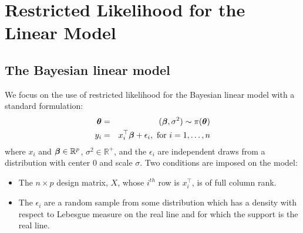 \documentclass[11pt]{article}
\makeatletter
\def\bth{\mbox{\boldmath $\theta$}}
\def\bbeta{\mbox{\boldmath $\beta$}}
\newcommand{\green}[1]{{\color{green}#1}}
\newcommand{\labitem}[2]{%
\def\@itemlabel{\textbf{#1}{.}}
\item
\def\@currentlabel{#1}\label{#2}}
\makeatother
\begin{document}
\section{Restricted Likelihood for the Linear Model}
\label{BayesLinMod}

\subsection{The Bayesian linear model}
We focus on the use of restricted likelihood for the Bayesian linear
model with a standard formulation: 
\begin{eqnarray}
\label{LinearModel}
\bth&=&(\bbeta,\sigma^2) \sim  \pi(\bth) 
\nonumber\\
y_i  & =  & x_i^\top \bbeta + \epsilon_i , \mbox{ for } i = 1, \ldots, n 
\end{eqnarray}
where $x_i$ and $\bbeta \in \mathbb{R}^p$, \green{$\sigma^2 \in \mathbb{R}^+$}, 
and the $\epsilon_i$ are independent 
draws from a distribution with center $0$ and scale $\sigma$.
Two conditions are imposed on the model:
\begin{itemize}
\labitem{C1}{fullRank} The $n \times p$ design matrix, $X$, whose $i^{th}$ row is $x_i^\top$, 
is of full column rank.  
\labitem{C2}{supReal} The $\epsilon_i$ are a random sample from some distribution which has a density with 
respect to Lebesgue measure on the real line and for which the support is the real line.  
\end{itemize}
\end{document}

